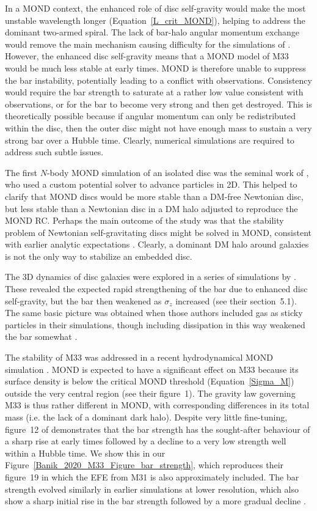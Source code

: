 \documentclass[fleqn,usenatbib,useAMS,onecolumn]{mnras} %
\begin{document}
In a MOND context, the enhanced role of disc self-gravity would make the most unstable wavelength longer (Equation~\ref{L_crit_MOND}), helping to address the dominant two-armed spiral. The lack of bar-halo angular momentum exchange would remove the main mechanism causing difficulty for the simulations of \citet{Sellwood_2019}. However, the enhanced disc self-gravity means that a MOND model of M33 would be much less stable at early times. MOND is therefore unable to suppress the bar instability, potentially leading to a conflict with observations. Consistency would require the bar strength to saturate at a rather low value consistent with observations, or for the bar to become very strong and then get destroyed. This is theoretically possible because if angular momentum can only be redistributed within the disc, then the outer disc might not have enough mass to sustain a very strong bar over a Hubble time. Clearly, numerical simulations are required to address such subtle issues.

The first $N$-body MOND simulation of an isolated disc was the seminal work of \citet{Brada_1999}, who used a custom potential solver to advance particles in 2D. This helped to clarify that MOND discs would be more stable than a DM-free Newtonian disc, but less stable than a Newtonian disc in a DM halo adjusted to reproduce the MOND RC. Perhaps the main outcome of the study was that the stability problem of Newtonian self-gravitating discs \citep[e.g.][]{Hohl_1971} might be solved in MOND, consistent with earlier analytic expectations \citep{Milgrom_1989}. Clearly, a dominant DM halo around galaxies is not the only way to stabilize an embedded disc.

The 3D dynamics of disc galaxies were explored in a series of simulations by \citet{Tiret_2007}. These revealed the expected rapid strengthening of the bar due to enhanced disc self-gravity, but the bar then weakened as $\sigma_z$ increased (see their section~5.1). The same basic picture was obtained when those authors included gas as sticky particles in their simulations, though including dissipation in this way weakened the bar somewhat \citep{Tiret_2008_gas}.

The stability of M33 was addressed in a recent hydrodynamical MOND simulation \citep{Banik_2020_M33}. MOND is expected to have a significant effect on M33 because its surface density is below the critical MOND threshold (Equation~\ref{Sigma_M}) outside the very central region (see their figure~1). The gravity law governing M33 is thus rather different in MOND, with corresponding differences in its total mass (i.e. the lack of a dominant dark halo). Despite very little fine-tuning, figure~12 of \citet{Banik_2020_M33} demonstrates that the bar strength has the sought-after behaviour of a sharp rise at early times followed by a decline to a very low strength well within a Hubble time. We show this in our Figure~\ref{Banik_2020_M33_Figure_bar_strength}, which reproduces their figure~19 in which the EFE from M31 is also approximately included. The bar strength evolved similarly in earlier simulations at lower resolution, which also show a sharp initial rise in the bar strength followed by a more gradual decline \citep{Tiret_2007, Tiret_2008_gas}.
\end{document}
